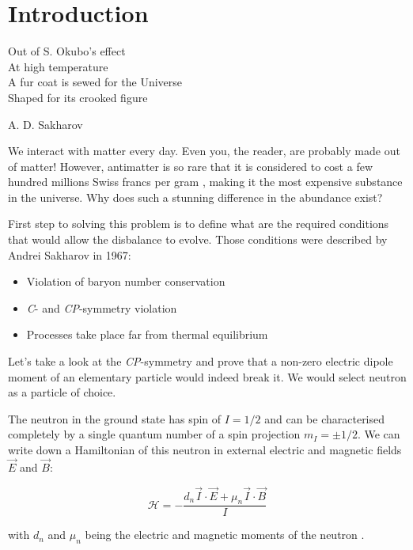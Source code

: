 \chapter{Introduction}
\label{chapter:introduction}

\setlength{\epigraphwidth}{0.43\textwidth}
\epigraph{
Out of S. Okubo's effect\\
At high temperature\\
A fur coat is sewed for the Universe\\
Shaped for its crooked figure
}{A. D. Sakharov \cite{Sakharov1991}}

We interact with matter every day. Even you, the reader, are probably made out of matter! However, antimatter is so rare that it is considered to cost a few hundred millions Swiss francs per gram \cite{DeRujula2001}, making it the most expensive substance in the universe. Why does such a stunning difference in the abundance exist?

First step to solving this problem is to define what are the required conditions that would allow the disbalance to evolve. Those conditions \cite{Dubbers2011} were described \cite{Sakharov1991} by Andrei Sakharov in 1967:

\begin{itemize}
	\item Violation of baryon number conservation
	\item \textit{C}- and \textit{CP}-symmetry violation
	\item Processes take place far from thermal equilibrium
\end{itemize}

Let's take a look at the \textit{CP}-symmetry and prove that a non-zero electric dipole moment of an elementary particle would indeed break it. We would select neutron as a particle of choice.

The neutron in the ground state has spin of $I = 1/2$ and can be characterised completely by a single quantum number of a spin projection $m_I = \pm 1/2$. We can write down a Hamiltonian \cite{Golub1994} of this neutron in external electric and magnetic fields $\vec{E}$ and $\vec{B}$:

\begin{equation}
	\mathcal{H} = -\frac{d_n \vec{I} \cdot \vec{E} + \mu_n \vec{I} \cdot \vec{B}}{I}
	\label{eq:neutron_hamiltonian}
\end{equation}

with $d_n$ and $\mu_n$ being the electric and magnetic moments of the neutron \cite{Golub1972}.

